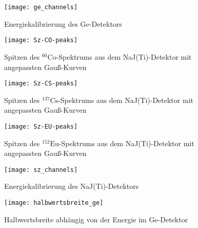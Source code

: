 \documentclass[11pt, ngerman, fleqn, DIV=15, headinclude, BCOR=2cm]{scrreprt}
\newcommand{\plotwidth}{0.8\linewidth}
\begin{document}
\begin{figure}
    \centering
    \texttt{[image: ge\_channels]}
    \caption{%
	    Energiekalibrierung des Ge-Detektors
    }
    \label{fig:ge_kanal}
\end{figure}



\begin{figure}
    \centering
    \texttt{[image: Sz-CO-peaks]}
    \caption{%
	    Spitzen des $^{60}\text{Co}$-Spektrums aus dem NaJ(Ti)-Detektor
	    mit angepassten Gauß-Kurven
    }
    \label{fig:}
\end{figure}

\begin{figure}
    \centering
    \texttt{[image: Sz-CS-peaks]}
    \caption{%
	    Spitzen des $^{137}\text{Cs}$-Spektrums aus dem NaJ(Ti)-Detektor
	    mit angepassten Gauß-Kurven
    }
    \label{fig:}
\end{figure}

\begin{figure}
    \centering
    \texttt{[image: Sz-EU-peaks]}
    \caption{%
	    Spitzen des $^{152}\text{Eu}$-Spektrums aus dem NaJ(Ti)-Detektor
	    mit angepassten Gauß-Kurven
    }
    \label{fig:}
\end{figure}

\begin{figure}
    \centering
    \texttt{[image: sz\_channels]}
    \caption{%
	    Energiekalibrierung des NaJ(Ti)-Detektors
    }
    \label{fig:sz_kanal}
\end{figure}


\begin{figure}
    \centering
    \texttt{[image: halbwertsbreite\_ge]}
    \caption{%
	    Halbwertsbreite abhängig von der Energie im Ge-Detektor
    }
    \label{fig:halbwertsbreite}
\end{figure}
\end{document}
